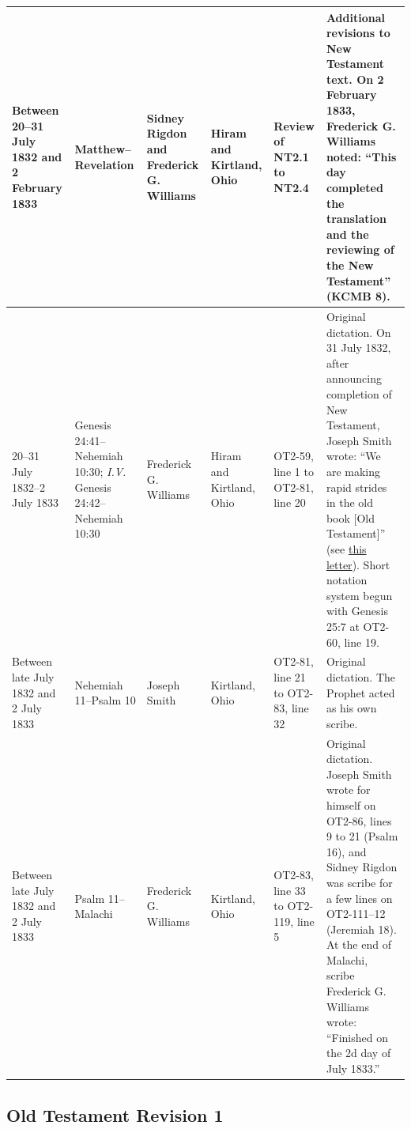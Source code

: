 \begin{landscape}
\begin{longtable}{p{1in}p{1.5in}p{1in}p{0.75in}p{1.5in}p{3in}}
			Between 20--31 July 1832 and 2 February 1833 & Matthew--Revelation & Sidney Rigdon and Frederick G. Williams & Hiram and Kirtland, Ohio & Review of NT2.1 to NT2.4 & Additional revisions to New Testament text. On 2 February 1833, Frederick G. Williams noted: ``This day completed the translation and the reviewing of the New Testament'' (KCMB 8). \\ \hline
			
			20--31 July 1832--2 July 1833 & Genesis 24:41--Nehemiah 10:30; \textit{I.V.} Genesis 24:42--Nehemiah 10:30 & Frederick G. Williams & Hiram and Kirtland, Ohio & OT2-59, line 1 to OT2-81, line 20 & Original dictation. On 31 July 1832, after announcing completion of New Testament, Joseph Smith wrote: ``We are making rapid strides in the old book [Old Testament]'' (see \hyperref[EMS-1832-JS-31-JUL-1832]{this letter}). Short notation system begun with Genesis 25:7 at OT2-60, line 19. \\ \hline
			
			Between late July 1832 and 2 July 1833 & Nehemiah 11--Psalm 10 & Joseph Smith & Kirtland, Ohio & OT2-81, line 21 to OT2-83, line 32 & Original dictation. The Prophet acted as his own scribe. \\ \hline
			
			Between late July 1832 and 2 July 1833 & Psalm 11--Malachi & Frederick G. Williams & Kirtland, Ohio & OT2-83, line 33 to OT2-119, line 5 & Original dictation. Joseph Smith wrote for himself on OT2-86, lines 9 to 21 (Psalm 16), and Sidney Rigdon was scribe for a few lines on OT2-111--12 (Jeremiah 18). At the end of Malachi, scribe Frederick G. Williams wrote: ``Finished on the 2d day of July 1833.'' \\
			
		\end{longtable}
	
\end{landscape}\clearpage\normalsize

\subsection{Old Testament Revision 1}
	\label{JST-OTR1}
	
	
	
